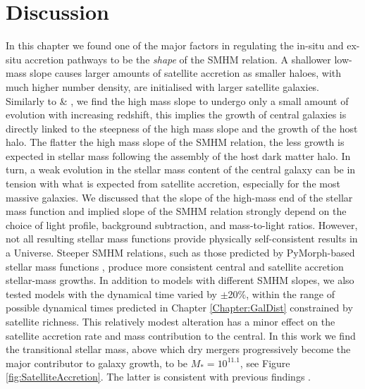 \section{Discussion}

In this chapter we found one of the major factors in regulating the in-situ and ex-situ accretion pathways to be the \textit{shape} of the SMHM relation. A shallower low-mass slope causes larger amounts of satellite accretion as smaller haloes, with much higher number density, are initialised with larger satellite galaxies. Similarly to \citet{Shankar2006NewFormation} \& \citet{Moster2018Emerge10}, we find the high mass slope to undergo only a small amount of evolution with increasing redshift, this implies the growth of central galaxies is directly linked to the steepness of the high mass slope and the growth of the host halo. The flatter the high mass slope of the SMHM relation, the less growth is expected in stellar mass following the assembly of the host dark matter halo. In turn, a weak evolution in the stellar mass content of the central galaxy can be in tension with what is expected from satellite accretion, especially for the most massive galaxies. We discussed that the slope of the high-mass end of the stellar mass function and implied slope of the SMHM relation strongly depend on the choice of light profile, background subtraction, and mass-to-light ratios. However, not all resulting stellar mass functions provide physically self-consistent results in a \LCDM Universe. Steeper SMHM relations, such as those predicted by PyMorph-based stellar mass functions \citep{Bernardi2013TheProfile}, produce more consistent central and satellite accretion stellar-mass growths. In addition to models with different SMHM slopes, we also tested models with the dynamical time varied by $\pm$20$\%$, within the range of possible dynamical times predicted in Chapter \ref{Chapter:GalDist} constrained by satellite richness. This relatively modest alteration has a minor effect on the satellite accretion rate and mass contribution to the central. In this work we find the transitional stellar mass, above which dry mergers progressively become the major contributor to galaxy growth, to be $M_{*} = 10^{11.1}$, see Figure \ref{fig:SatelliteAccretion}. The latter is consistent with previous findings \citep[e.g.,][]{Bernardi2011EvidenceRelations, Cappellari2013EffectEvolution, Shankar2013SizeUniverse}.

